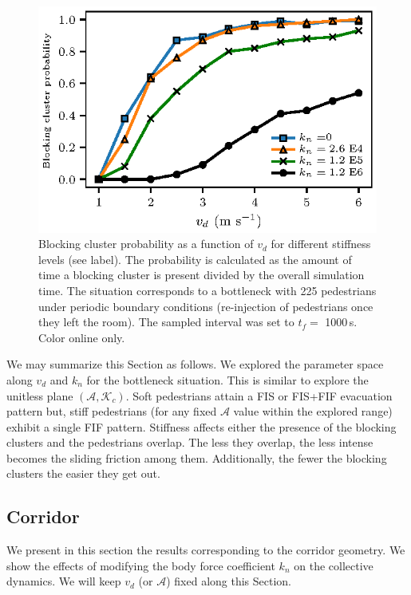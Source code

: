 \documentclass[preprint,12pt]{elsarticle}
\begin{document}
\begin{figure}[htbp!]
\centering
\includegraphics[width=0.7\columnwidth]
{./pbc_vs_vd_multi_kn.eps}
\caption{\label{pbc_vs_vd_multi_kn} Blocking cluster probability as a function of $v_d$ for different stiffness levels (see label). The probability is calculated as the amount of time a blocking cluster is present divided by the overall simulation time. The situation corresponds to a bottleneck with 225 pedestrians under periodic boundary conditions (re-injection of pedestrians once they left the room). The sampled interval was set to $t_f =$ 1000$\,$s. Color online only. }
\end{figure}

We may summarize this Section as follows. We explored the parameter space along $v_d$ and $k_n$ for the bottleneck situation. This is similar to explore the unitless plane $(\mathcal{A},\mathcal{K}_c)$. Soft pedestrians attain a FIS or FIS+FIF evacuation pattern but, stiff pedestrians (for any fixed $\mathcal{A}$ value within the explored range) exhibit a single FIF pattern. Stiffness affects either the presence of the blocking clusters and the pedestrians overlap. The less they overlap, the less intense becomes the sliding friction among them. Additionally, the fewer the blocking clusters the easier they get out. \\



\subsection{\label{corridor} Corridor}

We present in this section the results corresponding to the corridor geometry. 
We show the effects of modifying the body force coefficient $k_n$ on the 
collective dynamics. We will keep $v_d$ (or $\mathcal{A}$) 
fixed along this Section. \\
\end{document}
